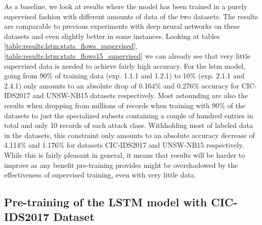As a baseline, we look at results where the model has been trained in a purely supervised fashion with different amounts of data of the two datasets. The results are comparable to previous experiments with deep neural networks on these datasets \cite{fog_based_detection_survey_2020} and even slightly better in some instances. Looking at tables \ref{table:results:lstm:stats_flows_supervised}, \ref{table:results:lstm:stats_flows15_supervised} we can already see that very little supervised data is needed to achieve fairly high accuracy. For the \gls{lstm} model, going from 90\% of training data (exp. 1.1.1 and 1.2.1) to 10\% (exp. 2.1.1 and 2.4.1) only amounts to an absolute drop of 0.164\% and 0.276\% accuracy for CIC-IDS2017 and UNSW-NB15 datasets respectively. Most astounding are also the results when dropping from millions of records when training with 90\% of the datasets to just the specialized subsets containing a couple of hundred entries in total and only 10 records of each attack class. Withholding most of labeled data in the datasets, this constraint only amounts to an absolute accuracy decrease of 4.114\% and 1.176\% for datasets CIC-IDS2017 and UNSW-NB15 respectively. While this is fairly pleasant in general, it means that results will be harder to improve as any benefit pre-training provides might be overshadowed by the effectiveness of supervised training, even with very little data. \par

\FloatBarrier









\FloatBarrier

\subsection{Pre-training of the LSTM model with CIC-IDS2017 Dataset}

